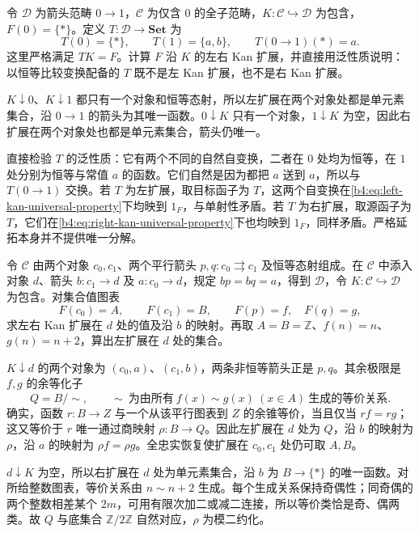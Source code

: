\begin{optionalexercise}\label{b4:ex:03-strict-extension-not-kan}
	令 \(\mathcal D\) 为箭头范畴 \(0\rightarrow1\)，\(\mathcal C\) 为仅含 \(0\) 的全子范畴，\(K:\mathcal C\hookrightarrow\mathcal D\) 为包含，\(F(0)=\{*\}\)。定义 \(T:\mathcal D\rightarrow\mathbf{Set}\) 为
	\[
		T(0)=\{*\},\qquad T(1)=\{a,b\},\qquad T(0\rightarrow1)(*)=a.
	\]
	这里严格满足 \(TK=F\)。计算 \(F\) 沿 \(K\) 的左右 Kan 扩展，并直接用泛性质说明：以恒等比较变换配备的 \(T\) 既不是左 Kan 扩展，也不是右 Kan 扩展。
\end{optionalexercise}
\begin{solution}
	\(K\downarrow0\)、\(K\downarrow1\) 都只有一个对象和恒等态射，所以左扩展在两个对象处都是单元素集合，沿 \(0\rightarrow1\) 的箭头为其唯一函数。\(0\downarrow K\) 只有一个对象，\(1\downarrow K\) 为空，因此右扩展在两个对象处也都是单元素集合，箭头仍唯一。

	直接检验 \(T\) 的泛性质：它有两个不同的自然自变换，二者在 \(0\) 处均为恒等，在 \(1\) 处分别为恒等与常值 \(a\) 的函数。它们自然是因为都把 \(a\) 送到 \(a\)，所以与 \(T(0\rightarrow1)\) 交换。若 \(T\) 为左扩展，取目标函子为 \(T\)，这两个自变换在\eqref{b4:eq:left-kan-universal-property}下均映到 \(1_F\)，与单射性矛盾。若 \(T\) 为右扩展，取源函子为 \(T\)，它们在\eqref{b4:eq:right-kan-universal-property}下也均映到 \(1_F\)，同样矛盾。严格延拓本身并不提供唯一分解。
\end{solution}

\begin{optionalexercise}\label{b4:ex:03-kan-coequalizer}
	令 \(\mathcal C\) 由两个对象 \(c_0,c_1\)、两个平行箭头 \(p,q:c_0\rightrightarrows c_1\) 及恒等态射组成。在 \(\mathcal C\) 中添入对象 \(d\)、箭头 \(b:c_1\rightarrow d\) 及 \(a:c_0\rightarrow d\)，规定 \(bp=bq=a\)，得到 \(\mathcal D\)，令 \(K:\mathcal C\hookrightarrow\mathcal D\) 为包含。对集合值图表
	\[
		F(c_0)=A,\qquad F(c_1)=B,\qquad F(p)=f,\quad F(q)=g,
	\]
	求左右 Kan 扩展在 \(d\) 处的值及沿 \(b\) 的映射。再取 \(A=B=\mathbb Z\)、\(f(n)=n\)、\(g(n)=n+2\)，算出左扩展在 \(d\) 处的集合。
\end{optionalexercise}
\begin{solution}
	\(K\downarrow d\) 的两个对象为 \((c_0,a)\)、\((c_1,b)\)，两条非恒等箭头正是 \(p,q\)。其余极限是 \(f,g\) 的余等化子
	\[
		Q=B/{\sim},\qquad
		\sim\ \text{为由所有}\ f(x)\sim g(x)\ (x\in A)\ \text{生成的等价关系}.
	\]
	确实，函数 \(r:B\rightarrow Z\) 与一个从该平行图表到 \(Z\) 的余锥等价，当且仅当 \(rf=rg\)；这又等价于 \(r\) 唯一通过商映射 \(\rho:B\rightarrow Q\)。因此左扩展在 \(d\) 处为 \(Q\)，沿 \(b\) 的映射为 \(\rho\)，沿 \(a\) 的映射为 \(\rho f=\rho g\)。全忠实恢复使扩展在 \(c_0,c_1\) 处仍可取 \(A,B\)。

	\(d\downarrow K\) 为空，所以右扩展在 \(d\) 处为单元素集合，沿 \(b\) 为 \(B\rightarrow\{*\}\) 的唯一函数。对所给整数图表，等价关系由 \(n\sim n+2\) 生成。每个生成关系保持奇偶性；同奇偶的两个整数相差某个 \(2m\)，可用有限次加二或减二连接，所以等价类恰是奇、偶两类。故 \(Q\) 与底集合 \(\mathbb Z/2\mathbb Z\) 自然对应，\(\rho\) 为模二约化。
\end{solution}

